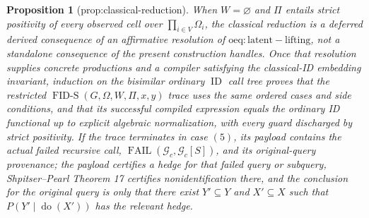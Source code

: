 \documentclass{article}
\newtheorem{proposition}{Proposition}
\begin{document}
\begin{proposition}[prop:classical-reduction]\label{prop:classical-reduction}
When \(W=\varnothing\) and \(\Pi\) entails strict positivity of every observed cell over \(\prod_{i\in V}\Omega_i\), the classical reduction is a deferred derived consequence of an affirmative resolution of \(\mathrm{oeq:latent-lifting}\), not a standalone consequence of the present construction handles. Once that resolution supplies concrete productions and a compiler satisfying the classical-ID embedding invariant, induction on the bisimilar ordinary \(\operatorname{ID}\) call tree proves that the restricted \(\operatorname{FID\text{-}S}(G,\Omega,W,\Pi,x,y)\) trace uses the same ordered cases and side conditions, and that its successful compiled expression equals the ordinary ID functional up to explicit algebraic normalization, with every guard discharged by strict positivity. If the trace terminates in case \((5)\), its payload contains the actual failed recursive call, \(\operatorname{FAIL}(\mathcal G_c,\mathcal G_c[S])\), and its original-query provenance; the payload certifies a hedge for that failed query or subquery, Shpitser--Pearl Theorem 17 certifies nonidentification there, and the conclusion for the original query is only that there exist \(Y'\subseteq Y\) and \(X'\subseteq X\) such that \(P(Y'\mid\operatorname{do}(X'))\) has the relevant hedge.
\end{proposition}
\end{document}
